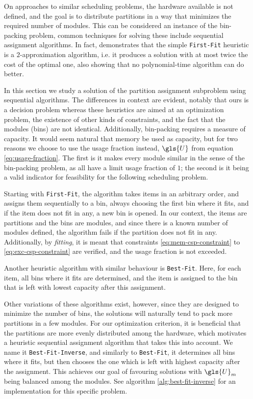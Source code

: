 \documentclass[main.tex]{subfiles}
\begin{document}
On approaches to similar scheduling problems, the hardware available is not defined, and the goal is to distribute partitions in a way that minimizes the required number of modules.
This can be considered an instance of the bin-packing problem, common techniques for solving these include sequential assignment algorithms.
In fact, \textcite{verschae2010scheduling} demonstrates that the simple \texttt{First-Fit} heuristic is a $2$-approximation algorithm, i.e. it produces a solution with at most twice the cost of the optimal one, also showing that no polynomial-time algorithm can do better.

In this section we study a solution of the partition assignment subproblem using sequential algorithms.
The differences in context are evident, notably that ours is a decision problem whereas these heuristics are aimed at an optimization problem, the existence of other kinds of constraints, and the fact that the modules (bins) are not identical.
Additionally, bin-packing requires a measure of capacity.
It would seem natural that memory be used as capacity, but for two reasons we choose to use the usage fraction instead, $\gls{U}$ from equation \ref{eq:usage-fraction}.
The first is it makes every module similar in the sense of the bin-packing problem, as all have a limit usage fraction of $1$; the second is it being a valid indicator for feasibility for the following scheduling problem.

Starting with \texttt{First-Fit}, the algorithm takes items in an arbitrary order, and assigns them sequentially to a bin, always choosing the first bin where it fits, and if the item does not fit in any, a new bin is opened. 
In our context, the items are partitions and the bins are modules, and since there is a known number of modules defined, the algorithm fails if the partition does not fit in any.
Additionally, by \textit{fitting}, it is meant that constraints \ref{eq:mem-csp-constraint} to \ref{eq:exc-csp-constraint} are verified, and the usage fraction is not exceeded.

Another heuristic algorithm with similar behaviour is \texttt{Best-Fit}.
Here, for each item, all bins where it fits are determined, and the item is assigned to the bin that is left with lowest capacity after this assignment.

Other variations of these algorithms exist, however, since they are designed to minimize the number of bins, the solutions will naturally tend to pack more partitions in a few modules.
For our optimization criterion, it is beneficial that the partitions are more evenly distributed among the hardware, which motivates a heuristic sequential assignment algorithm that takes this into account.
We name it \texttt{Best-Fit-Inverse}, and similarly to \texttt{Best-Fit}, it determines all bins where it fits, but then chooses the one which is left with highest capacity after the assignment.
This achieves our goal of favouring solutions with $\gls{U}_m$ being balanced among the modules.
See algorithm \ref{alg:best-fit-inverse} for an implementation for this specific problem.
\end{document}
